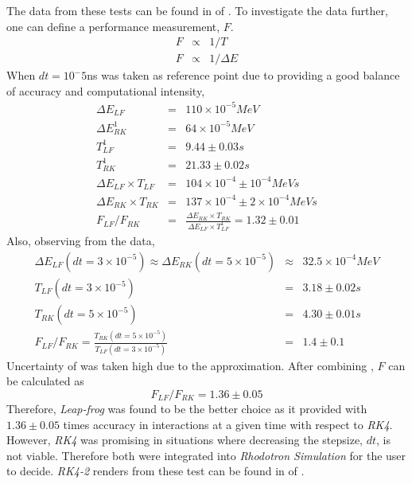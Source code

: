 \documentclass[a4paper,oneside,12pt]{report}
\numberwithin{equation}{chapter}
\begin{document}
The data from these tests can be found in  of .
To investigate the data further, one can define a performance measurement, $F$.
\begin{eqnarray*}
    F &\propto& 1/T \\
    F &\propto& 1/\Delta E 
\end{eqnarray*}
When $dt=10^-5$ns was taken as reference point due to providing a good balance of accuracy and computational intensity,
\begin{eqnarray} \label{eq:f_lf_rk_mag_1}
    \Delta E_{LF} &=& 110 \times 10^{-5} MeV \nonumber\\
    \Delta E_{RK}^1 &=& 64 \times 10^{-5} MeV \nonumber\\
    T_{LF}^1 &=& 9.44 \pm 0.03 s \nonumber\\
    T_{RK}^1 &=& 21.33 \pm 0.02 s \nonumber\\
    \Delta E_{LF} \times T_{LF} &=& 104 \times 10^{-4} \pm 10^{-4} MeV s \nonumber\\ %
    \Delta E_{RK} \times T_{RK} &=& 137 \times 10^{-4} \pm 2\times 10^{-4}  MeV s \nonumber\\ %
    F_{LF}/F_{RK} &=& \frac{\Delta E_{RK} \times T_{RK} }{\Delta E_{LF} \times T_{LF}^1} = 1.32 \pm 0.01
\end{eqnarray}
Also, observing from the data,
\begin{eqnarray} \label{eq:f_lf_rk_mag_2}
    \Delta E_{LF} (dt=3 \times 10^{-5}) \approx \Delta E_{RK} (dt=5 \times 10^{-5}) &\approx& 32.5 \times 10^{-4} MeV \nonumber\\
    T_{LF}(dt=3 \times 10^{-5})  &=& 3.18 \pm 0.02 s \nonumber\\ %
    T_{RK}(dt=5 \times 10^{-5})  &=& 4.30 \pm 0.01 s \nonumber\\ %
    F_{LF}/F_{RK} = \frac{T_{RK}(dt=5 \times 10^{-5})}{T_{LF}(dt=3 \times 10^{-5})} &=& 1.4 \pm 0.1
\end{eqnarray}
Uncertainty of  was taken high due to the approximation. After combining , $F$ can be calculated as
\begin{equation}
    F_{LF}/F_{RK} = 1.36 \pm 0.05
\end{equation}
Therefore, \textit{Leap-frog} was found to be the better choice as it provided with $1.36 \pm 0.05$ times accuracy in \eB interactions at a given time with respect to \textit{RK4}. However,
\textit{RK4} was promising in situations where decreasing the stepsize, $dt$, is not viable. Therefore both were integrated into \textit{Rhodotron Simulation} for the user to decide.
\textit{RK4-2} renders from these test can be found in  of .
\end{document}
